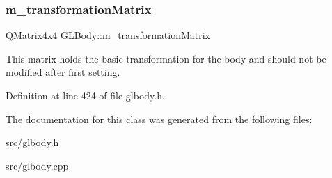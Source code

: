 \mbox{\label{class_g_l_body_a38b323efc7e55b6c770638cd108c2143}} 
\subsubsection{\texorpdfstring{m\_transformationMatrix}{m\_transformationMatrix}}
{\footnotesize\ttfamily Q\+Matrix4x4 G\+L\+Body\+::m\+\_\+transformation\+Matrix\hspace{0.3cm}{\ttfamily [protected]}}

This matrix holds the basic transformation for the body and should not be modified after first setting. 

Definition at line 424 of file glbody.\+h.



The documentation for this class was generated from the following files\+:\begin{DoxyCompactItemize}
\item 
src/glbody.\+h\item 
src/glbody.\+cpp\end{DoxyCompactItemize}
